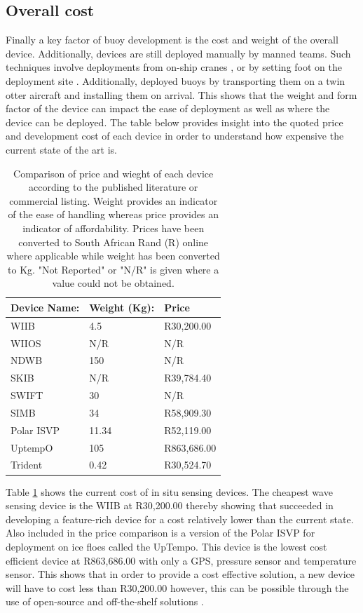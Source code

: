 \subsection{Overall cost}
\label{subsec:sec2_overallcost}
Finally a key factor of buoy development is the cost and weight of the overall device. Additionally, devices are still deployed manually by manned teams. Such techniques involve deployments from on-ship cranes \cite{alberello2019drift,kohout2015device}, or by setting foot on the deployment site \cite{planck2019evolution,rabault2019open}. Additionally, \textcite{doble2017robust} deployed buoys by transporting them on a twin otter aircraft and installing them on arrival. This shows that the weight and form factor of the device can impact the ease of deployment as well as where the device can be deployed. The table below provides insight into the quoted price and development cost of each device in order to understand how expensive the current state of the art is.
\begin{table}[H]
	\centering
	\caption{Comparison of price and wieght of each device according to the published literature or commercial listing. Weight provides an indicator of the ease of handling whereas price provides an indicator of affordability. Prices have been converted to South African Rand (R)  online \cite{usdcoversion}where applicable while weight has been converted to Kg. "Not Reported"  or "N/R" is given where a value could not be obtained.}
	\label{tab:device_price}
	\small
	\begin{tabular}{|l|l|l|}
		\hline
		\textbf{Device Name:} & \textbf{Weight (Kg):} & \textbf{Price} \\
		\hline
		WIIB & 4.5 & R30,200.00\\
		\hline
		WIIOS & N/R & N/R \\
		\hline
		NDWB & 150 & N/R \\
		\hline
		SKIB  & N/R &  R39,784.40\\
		\hline
		SWIFT & 30 & N/R \\
		\hline
		SIMB & 34 & R58,909.30 \\
		\hline
		Polar ISVP & 11.34 & R52,119.00 \\
		\hline
		UptempO & 105 & R863,686.00 \\
		\hline
		Trident & 0.42 & R30,524.70 \\
		\hline
	\end{tabular}
\end{table}

Table \ref{tab:device_price} shows the current cost of in situ sensing devices. The cheapest wave sensing device is the WIIB at R30,200.00 thereby showing that \textcite{rabault2019open} succeeded in developing a feature-rich device for a cost relatively lower than the current state. Also included in the price comparison is a version of the Polar ISVP for deployment on ice floes called the UpTempo. This device is the lowest cost efficient device at R863,686.00 with only a GPS, pressure sensor and temperature sensor. This shows that in order to provide a cost effective solution, a new device will have to cost less than R30,200.00 however, this can be possible through the use of open-source and off-the-shelf solutions \cite{bonvoisin2017source}.\par
\newpage
